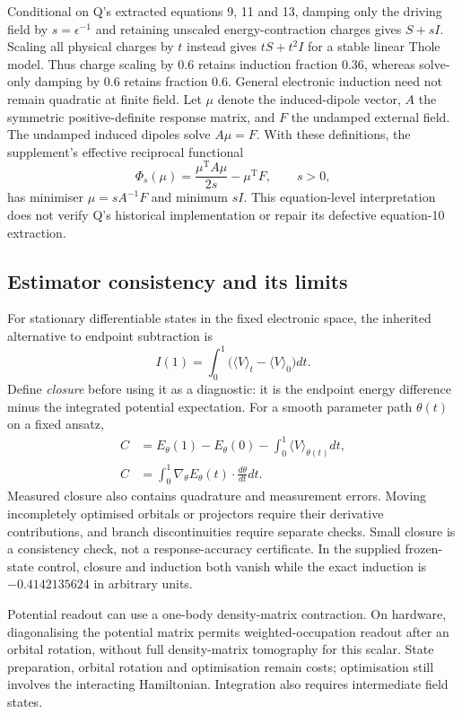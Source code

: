 \documentclass{article}
\begin{document}
Conditional on Q's extracted equations 9, 11 and 13, damping only the driving field by $s=\epsilon^{-1}$ and retaining unscaled energy-contraction charges gives $S+sI$. Scaling all physical charges by $t$ instead gives $tS+t^2I$ for a stable linear Thole model. Thus charge scaling by 0.6 retains induction fraction 0.36, whereas solve-only damping by 0.6 retains fraction 0.6. General electronic induction need not remain quadratic at finite field. Let $\mu$ denote the induced-dipole vector, $A$ the symmetric positive-definite response matrix, and $F$ the undamped external field. The undamped induced dipoles solve $A\mu=F$. With these definitions, the supplement's effective reciprocal functional
\begin{equation*}
\Phi_s(\mu)=\frac{\mu^{\mathrm T}A\mu}{2s}-\mu^{\mathrm T}F,\qquad s>0,
\end{equation*}
has minimiser $\mu=sA^{-1}F$ and minimum $sI$. This equation-level interpretation does not verify Q's historical implementation or repair its defective equation-10 extraction.

\subsection{Estimator consistency and its limits}

For stationary differentiable states in the fixed electronic space, the inherited alternative to endpoint subtraction is
\begin{equation*}
I(1)=\int_0^1\bigl(\langle V\rangle_t-\langle V\rangle_0\bigr)dt.
\end{equation*}
Define \emph{closure} before using it as a diagnostic: it is the endpoint energy difference minus the integrated potential expectation. For a smooth parameter path $\theta(t)$ on a fixed ansatz,
\begin{align*}
C&=E_\theta(1)-E_\theta(0)-\int_0^1\langle V\rangle_{\theta(t)}dt,\\
C&=\int_0^1\nabla_\theta E_\theta(t)\cdot\frac{d\theta}{dt}dt.
\end{align*}
Measured closure also contains quadrature and measurement errors. Moving incompletely optimised orbitals or projectors require their derivative contributions, and branch discontinuities require separate checks. Small closure is a consistency check, not a response-accuracy certificate. In the supplied frozen-state control, closure and induction both vanish while the exact induction is $-0.4142135624$ in arbitrary units.

Potential readout can use a one-body density-matrix contraction. On hardware, diagonalising the potential matrix permits weighted-occupation readout after an orbital rotation, without full density-matrix tomography for this scalar. State preparation, orbital rotation and optimisation remain costs; optimisation still involves the interacting Hamiltonian. Integration also requires intermediate field states.
\end{document}
